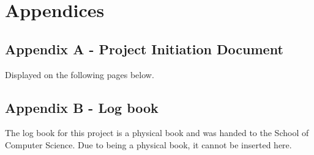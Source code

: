 \documentclass[oneside, 10pt]{article}
\begin{document}
	\newpage
	
	\nocite{*}
	\printbibliography
	
	\newpage
	\section{Appendices}
		\subsection{Appendix A - Project Initiation Document}
		Displayed on the following pages below.
		
		\subsection{Appendix B - Log book}
		The log book for this project is a physical book and was handed to the School of Computer Science. Due to being a physical book, it cannot be inserted here.
	
\end{document}

